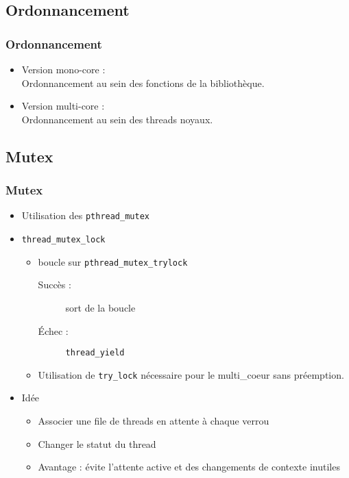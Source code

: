\documentclass{beamer}
\begin{document}
\subsection{Ordonnancement}

\begin{frame}
  \frametitle{Ordonnancement}
  \begin{itemize}
    \item Version mono-core : \\
    Ordonnancement au sein des fonctions de la bibliothèque.
    \item Version multi-core : \\
    Ordonnancement au sein des threads noyaux.
  \end{itemize}
\end{frame}

\subsection{Mutex}

\begin{frame}[containsverbatim]
  \frametitle{Mutex}
  \begin{itemize}
    \item Utilisation des \verb!pthread_mutex!
    \item \verb!thread_mutex_lock!
      \begin{itemize}
        \item boucle sur \verb!pthread_mutex_trylock!
          \begin{description}
          \item[Succès :] sort de la boucle
          \item[Échec :]  \verb!thread_yield!
          \end{description}
        \item Utilisation de \verb!try_lock! nécessaire pour le
          multi\_coeur sans préemption.
      \end{itemize}
      \item Idée
        \begin{itemize}
        \item Associer une file de threads en attente à chaque verrou
        \item Changer le statut du thread
        \item Avantage : évite l'attente active et des changements de
          contexte inutiles
        \end{itemize}
  \end{itemize}
\end{frame}
\end{document}
